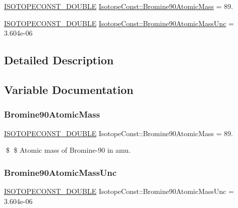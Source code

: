 \begin{DoxyCompactItemize}
\item 
\mbox{\hyperlink{group___isotope_const-_macros_ga8f45a7272ce02c0b4c65c44636ed719a}{I\+S\+O\+T\+O\+P\+E\+C\+O\+N\+S\+T\+\_\+\+D\+O\+U\+B\+LE}} \mbox{\hyperlink{group___isotope_const-_bromine-_br90_ga10c73b0c01a12e22f010ef47c1826f62}{Isotope\+Const\+::\+Bromine90\+Atomic\+Mass}} = 89.
\item 
\mbox{\hyperlink{group___isotope_const-_macros_ga8f45a7272ce02c0b4c65c44636ed719a}{I\+S\+O\+T\+O\+P\+E\+C\+O\+N\+S\+T\+\_\+\+D\+O\+U\+B\+LE}} \mbox{\hyperlink{group___isotope_const-_bromine-_br90_ga78665d4dd8a0a59ecb2cb61e32d68e7e}{Isotope\+Const\+::\+Bromine90\+Atomic\+Mass\+Unc}} = 3.\+604e-\/06
\end{DoxyCompactItemize}


\subsection{Detailed Description}


\subsection{Variable Documentation}
\mbox{\label{group___isotope_const-_bromine-_br90_ga10c73b0c01a12e22f010ef47c1826f62}} 
\subsubsection{\texorpdfstring{Bromine90\+Atomic\+Mass}{Bromine90AtomicMass}}
{\footnotesize\ttfamily \mbox{\hyperlink{group___isotope_const-_macros_ga8f45a7272ce02c0b4c65c44636ed719a}{I\+S\+O\+T\+O\+P\+E\+C\+O\+N\+S\+T\+\_\+\+D\+O\+U\+B\+LE}} Isotope\+Const\+::\+Bromine90\+Atomic\+Mass = 89.}

\$ \$ Atomic mass of Bromine-\/90 in amu. \mbox{\label{group___isotope_const-_bromine-_br90_ga78665d4dd8a0a59ecb2cb61e32d68e7e}} 
\subsubsection{\texorpdfstring{Bromine90\+Atomic\+Mass\+Unc}{Bromine90AtomicMassUnc}}
{\footnotesize\ttfamily \mbox{\hyperlink{group___isotope_const-_macros_ga8f45a7272ce02c0b4c65c44636ed719a}{I\+S\+O\+T\+O\+P\+E\+C\+O\+N\+S\+T\+\_\+\+D\+O\+U\+B\+LE}} Isotope\+Const\+::\+Bromine90\+Atomic\+Mass\+Unc = 3.\+604e-\/06}

